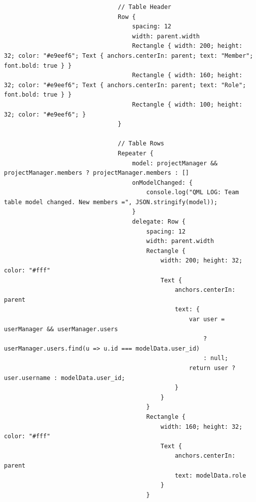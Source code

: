 \documentclass{report}
\begin{document}
\begin{lstlisting}
                                // Table Header
                                Row {
                                    spacing: 12
                                    width: parent.width
                                    Rectangle { width: 200; height: 32; color: "#e9eef6"; Text { anchors.centerIn: parent; text: "Member"; font.bold: true } }
                                    Rectangle { width: 160; height: 32; color: "#e9eef6"; Text { anchors.centerIn: parent; text: "Role"; font.bold: true } }
                                    Rectangle { width: 100; height: 32; color: "#e9eef6"; }
                                }

                                // Table Rows
                                Repeater {
                                    model: projectManager && projectManager.members ? projectManager.members : []
                                    onModelChanged: {
                                        console.log("QML LOG: Team table model changed. New members =", JSON.stringify(model));
                                    }
                                    delegate: Row {
                                        spacing: 12
                                        width: parent.width
                                        Rectangle {
                                            width: 200; height: 32; color: "#fff"
                                            Text {
                                                anchors.centerIn: parent
                                                text: {
                                                    var user = userManager && userManager.users
                                                        ? userManager.users.find(u => u.id === modelData.user_id)
                                                        : null;
                                                    return user ? user.username : modelData.user_id;
                                                }
                                            }
                                        }
                                        Rectangle {
                                            width: 160; height: 32; color: "#fff"
                                            Text {
                                                anchors.centerIn: parent
                                                text: modelData.role
                                            }
                                        }
                

\end{lstlisting}
\end{document}
